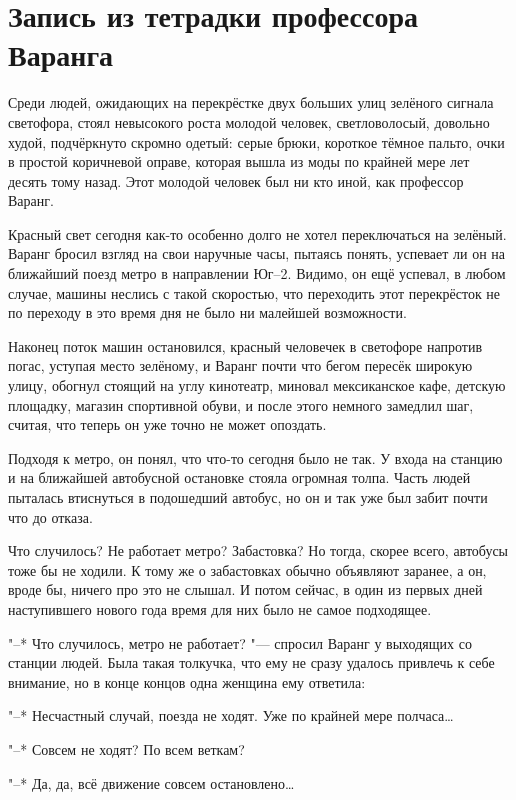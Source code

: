 \section{Запись из тетрадки профессора Варанга}

Среди людей, ожидающих на перекрёстке двух больших улиц зелёного сигнала
светофора, стоял невысокого роста молодой человек, светловолосый, довольно худой,
подчёркнуто скромно одетый: серые брюки, короткое тёмное пальто, очки в простой
коричневой оправе, которая вышла из моды по крайней мере лет десять тому назад.
Этот молодой человек был ни кто иной, как профессор Варанг.

Красный свет сегодня как-то особенно долго не хотел переключаться на зелёный.
Варанг бросил взгляд на свои наручные часы, пытаясь понять, успевает ли он на
ближайший поезд метро в направлении Юг--2.
Видимо, он ещё успевал, в любом случае, машины неслись с такой скоростью, что
переходить этот перекрёсток не по переходу в это время дня не было ни малейшей
возможности.

Наконец поток машин остановился, красный человечек в светофоре напротив погас,
уступая место зелёному, и Варанг почти что бегом пересёк широкую улицу, обогнул
стоящий на углу кинотеатр, миновал мексиканское кафе, детскую площадку, магазин
спортивной обуви, и после этого немного замедлил шаг, считая, что теперь он уже
точно не может опоздать.

Подходя к метро, он понял, что что-то сегодня было не так.
У входа на станцию и на ближайшей автобусной остановке стояла огромная толпа.
Часть людей пыталась втиснуться в подошедший автобус, но он и так уже был забит
почти что до отказа.

Что случилось?
Не работает метро?
Забастовка?
Но тогда, скорее всего, автобусы тоже бы не ходили.
К тому же о забастовках обычно объявляют заранее, а он, вроде бы, ничего про это
не слышал.
И потом сейчас, в один из первых дней наступившего нового года время для них
было не самое подходящее.

"--* Что случилось, метро не работает? "--- спросил Варанг у выходящих со
станции людей.
Была такая толкучка, что ему не сразу удалось привлечь к себе внимание, но в
конце концов одна женщина ему ответила:

"--* Несчастный случай, поезда не ходят.
Уже по крайней мере полчаса\ldots

"--* Совсем не ходят?
По всем веткам?

"--* Да, да, всё движение совсем остановлено\ldots

